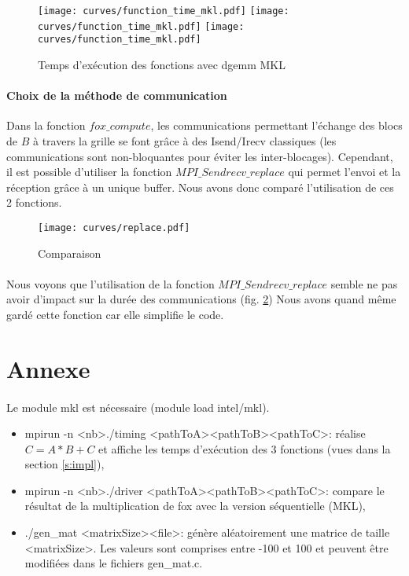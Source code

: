 \documentclass[12pt]{article}
\begin{document}
\begin{figure}[ht]
  \centering
  \texttt{[image: curves/function\_time\_mkl.pdf]}
  \endminipage
  \texttt{[image: curves/function\_time\_mkl.pdf]}
  \endminipage
  \texttt{[image: curves/function\_time\_mkl.pdf]}
  \endminipage
  \caption{\label{fig:fun_time2} Temps d'exécution des fonctions avec dgemm MKL}
\end{figure}


\paragraph{Choix de la méthode de communication}
Dans la fonction $fox\_compute$, les communications permettant l'échange des blocs de $B$ à travers la grille se font grâce à des Isend/Irecv classiques (les communications sont non-bloquantes pour éviter les inter-blocages). Cependant, il est possible d'utiliser la fonction $MPI\_Sendrecv\_replace$ qui permet l'envoi et la réception grâce à un unique buffer. Nous avons donc comparé l'utilisation de ces 2 fonctions.

\begin{figure}[ht]
  \centering
  \texttt{[image: curves/replace.pdf]}
  \caption{\label{fig:replace} Comparaison }
\end{figure}

\paragraph{}Nous voyons que l'utilisation de la fonction $MPI\_Sendrecv\_replace$ semble ne pas avoir d'impact sur la durée des communications (fig. \ref{fig:replace}) Nous avons quand même gardé cette fonction car elle simplifie le code.


\newpage
\section{Annexe}
\paragraph{}Le module mkl est nécessaire (module load intel/mkl).
\begin{itemize}
\item mpirun -n \textless nb\textgreater  ./timing \textless pathToA\textgreater  \textless pathToB\textgreater  \textless pathToC\textgreater  : réalise $C=A*B + C$ et affiche les temps d'exécution des 3 fonctions (vues dans la section \ref{s:impl}),
\item mpirun -n \textless nb\textgreater  ./driver \textless pathToA\textgreater  \textless pathToB\textgreater  \textless pathToC\textgreater  : compare le résultat de la multiplication de fox avec la version séquentielle (MKL),
\item ./gen\_mat \textless matrixSize\textgreater  \textless file\textgreater  : génère aléatoirement une matrice de taille \textless matrixSize\textgreater . Les valeurs sont comprises entre -100 et 100 et peuvent être modifiées dans le fichiers gen\_mat.c.
\end{itemize}
\end{document}
